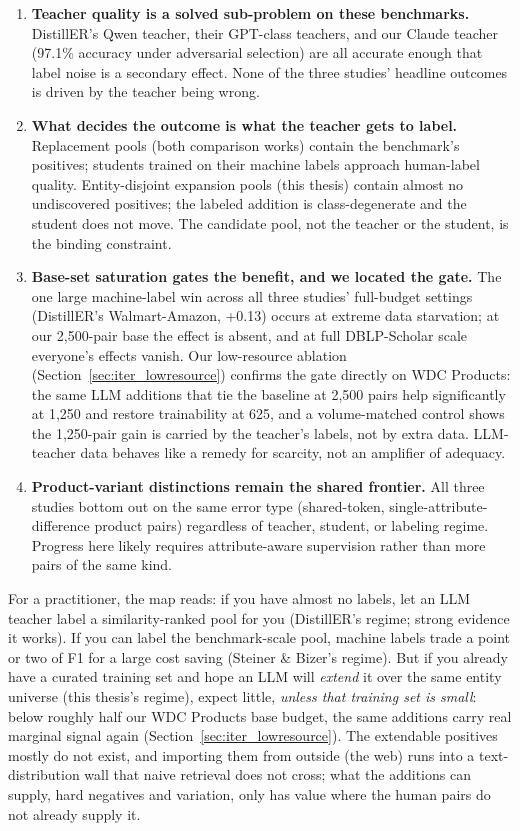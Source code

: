 \documentclass[a4paper,oneside,bibliography=totoc]{scrbook}
\begin{document}
\begin{enumerate}
\item \textbf{Teacher quality is a solved sub-problem on these benchmarks.} DistillER's Qwen teacher, their GPT-class teachers, and our Claude teacher (97.1\% accuracy under adversarial selection) are all accurate enough that label noise is a secondary effect. None of the three studies' headline outcomes is driven by the teacher being wrong.
\item \textbf{What decides the outcome is what the teacher gets to label.} Replacement pools (both comparison works) contain the benchmark's positives; students trained on their machine labels approach human-label quality. Entity-disjoint expansion pools (this thesis) contain almost no undiscovered positives; the labeled addition is class-degenerate and the student does not move. The candidate pool, not the teacher or the student, is the binding constraint.
\item \textbf{Base-set saturation gates the benefit, and we located the gate.} The one large machine-label win across all three studies' full-budget settings (DistillER's Walmart-Amazon, +0.13) occurs at extreme data starvation; at our 2{,}500-pair base the effect is absent, and at full DBLP-Scholar scale everyone's effects vanish. Our low-resource ablation (Section~\ref{sec:iter_lowresource}) confirms the gate directly on WDC Products: the same LLM additions that tie the baseline at 2{,}500 pairs help significantly at 1{,}250 and restore trainability at 625, and a volume-matched control shows the 1{,}250-pair gain is carried by the teacher's labels, not by extra data. LLM-teacher data behaves like a remedy for scarcity, not an amplifier of adequacy.
\item \textbf{Product-variant distinctions remain the shared frontier.} All three studies bottom out on the same error type (shared-token, single-attribute-difference product pairs) regardless of teacher, student, or labeling regime. Progress here likely requires attribute-aware supervision rather than more pairs of the same kind.
\end{enumerate}

For a practitioner, the map reads: if you have almost no labels, let an LLM teacher label a similarity-ranked pool for you (DistillER's regime; strong evidence it works). If you can label the benchmark-scale pool, machine labels trade a point or two of F1 for a large cost saving (Steiner \& Bizer's regime). But if you already have a curated training set and hope an LLM will \emph{extend} it over the same entity universe (this thesis's regime), expect little, \emph{unless that training set is small}: below roughly half our WDC Products base budget, the same additions carry real marginal signal again (Section~\ref{sec:iter_lowresource}). The extendable positives mostly do not exist, and importing them from outside (the web) runs into a text-distribution wall that naive retrieval does not cross; what the additions can supply, hard negatives and variation, only has value where the human pairs do not already supply it.
\end{document}

